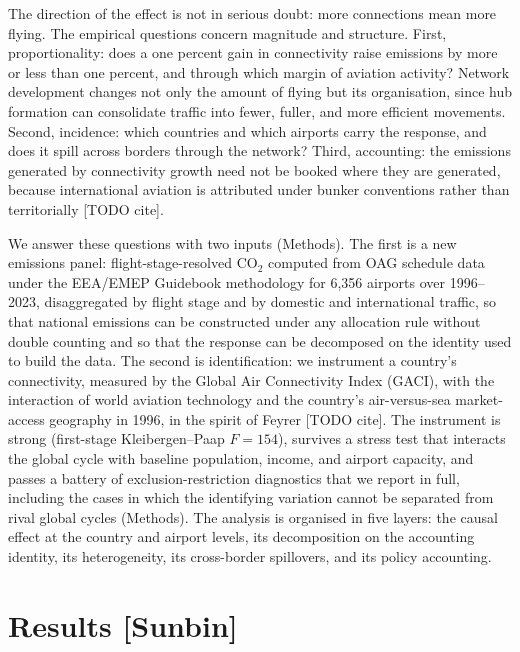\documentclass[12pt]{article}
\begin{document}
The direction of the effect is not in serious doubt: more connections mean
more flying. The empirical questions concern magnitude and structure.
First, proportionality: does a one percent gain in connectivity raise
emissions by more or less than one percent, and through which margin of
aviation activity? Network development changes not only the amount of
flying but its organisation, since hub formation can consolidate traffic
into fewer, fuller, and more efficient movements. Second, incidence: which
countries and which airports carry the response, and does it spill across
borders through the network? Third, accounting: the emissions generated by
connectivity growth need not be booked where they are generated, because
international aviation is attributed under bunker conventions rather than
territorially [TODO cite].

We answer these questions with two inputs (Methods). The first is a new
emissions panel: flight-stage-resolved CO$_2$ computed from OAG schedule
data under the EEA/EMEP Guidebook methodology for 6{,}356 airports over
1996--2023, disaggregated by flight stage and by domestic and international
traffic, so that national emissions can be constructed under any allocation
rule without double counting and so that the response can be decomposed on
the identity used to build the data. The second is identification: we
instrument a country's connectivity, measured by the Global Air
Connectivity Index (GACI), with the interaction of world aviation
technology and the country's air-versus-sea market-access geography in
1996, in the spirit of Feyrer [TODO cite]. The instrument is strong
(first-stage Kleibergen--Paap $F = 154$), survives a stress test that
interacts the global cycle with baseline population, income, and airport
capacity, and passes a battery of exclusion-restriction diagnostics that we
report in full, including the cases in which the identifying variation
cannot be separated from rival global cycles (Methods). The analysis is
organised in five layers: the causal effect at the country and airport
levels, its decomposition on the accounting identity, its heterogeneity,
its cross-border spillovers, and its policy accounting.

\section*{Results [Sunbin]}
\end{document}
